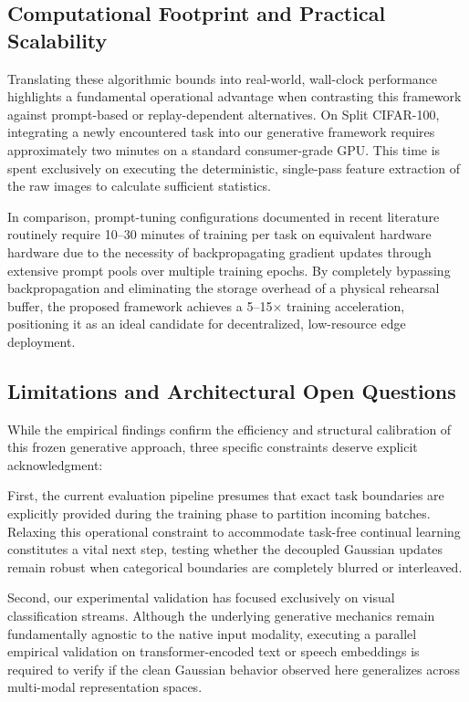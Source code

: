 \subsection{Computational Footprint and Practical Scalability}
\label{sec:an:compute}

Translating these algorithmic bounds into real-world, wall-clock performance highlights a fundamental operational advantage when contrasting this framework against prompt-based or replay-dependent alternatives. On Split CIFAR-100, integrating a newly encountered task into our generative framework requires approximately two minutes on a standard consumer-grade GPU. This time is spent exclusively on executing the deterministic, single-pass feature extraction of the raw images to calculate sufficient statistics. 

In comparison, prompt-tuning configurations documented in recent literature routinely require 10--30 minutes of training per task on equivalent hardware hardware due to the necessity of backpropagating gradient updates through extensive prompt pools over multiple training epochs. By completely bypassing backpropagation and eliminating the storage overhead of a physical rehearsal buffer, the proposed framework achieves a 5--15$\times$ training acceleration, positioning it as an ideal candidate for decentralized, low-resource edge deployment.

\subsection{Limitations and Architectural Open Questions}
\label{sec:an:limits}

While the empirical findings confirm the efficiency and structural calibration of this frozen generative approach, three specific constraints deserve explicit acknowledgment:

First, the current evaluation pipeline presumes that exact task boundaries are explicitly provided during the training phase to partition incoming batches. Relaxing this operational constraint to accommodate task-free continual learning constitutes a vital next step, testing whether the decoupled Gaussian updates remain robust when categorical boundaries are completely blurred or interleaved.

Second, our experimental validation has focused exclusively on visual classification streams. Although the underlying generative mechanics remain fundamentally agnostic to the native input modality, executing a parallel empirical validation on transformer-encoded text or speech embeddings is required to verify if the clean Gaussian behavior observed here generalizes across multi-modal representation spaces.

